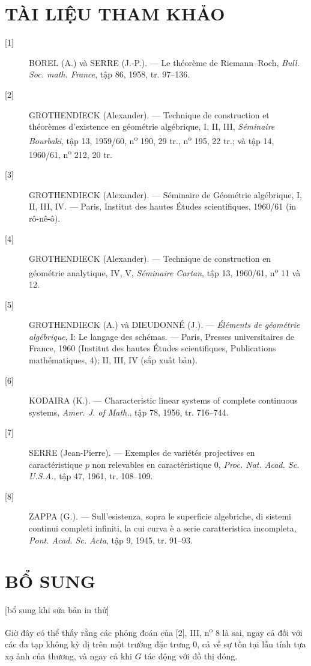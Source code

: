 \section*{TÀI LIỆU THAM KHẢO}

\begin{description}
\item[{[1]}] BOREL (A.) và SERRE (J.-P.). --- Le théorème de Riemann--Roch,
\emph{Bull. Soc. math. France}, tập 86, 1958, tr. 97--136.

\item[{[2]}] GROTHENDIECK (Alexander). --- Technique de construction et
théorèmes d'existence en géométrie algébrique, I, II, III, \emph{Séminaire
Bourbaki}, tập 13, 1959/60, n\textsuperscript{o} 190, 29 tr.,
n\textsuperscript{o} 195, 22 tr.; và tập 14, 1960/61,
n\textsuperscript{o} 212, 20 tr.

\item[{[3]}] GROTHENDIECK (Alexander). --- Séminaire de Géométrie algébrique,
I, II, III, IV. --- Paris, Institut des hautes Études scientifiques, 1960/61
(in rô-nê-ô).

\item[{[4]}] GROTHENDIECK (Alexander). --- Technique de construction en
géométrie analytique, IV, V, \emph{Séminaire Cartan}, tập 13, 1960/61,
n\textsuperscript{o} 11 và 12.

\item[{[5]}] GROTHENDIECK (A.) và DIEUDONNÉ (J.). --- \emph{Éléments de
géométrie algébrique}, I: Le langage des schémas. --- Paris, Presses
universitaires de France, 1960 (Institut des hautes Études scientifiques,
Publications mathématiques, 4); II, III, IV (sắp xuất bản).

\item[{[6]}] KODAIRA (K.). --- Characteristic linear systems of complete
continuous systems, \emph{Amer. J. of Math.}, tập 78, 1956, tr. 716--744.

\item[{[7]}] SERRE (Jean-Pierre). --- Exemples de variétés projectives en
caractéristique $p$ non relevables en caractéristique 0, \emph{Proc. Nat. Acad.
Sc. U.S.A.}, tập 47, 1961, tr. 108--109.

\item[{[8]}] ZAPPA (G.). --- Sull'esistenza, sopra le superficie algebriche, di
sistemi continui completi infiniti, la cui curva è a serie caratteristica
incompleta, \emph{Pont. Acad. Sc. Acta}, tập 9, 1945, tr. 91--93.
\end{description}

\section*{BỔ SUNG}
\begin{center}
{\small [bổ sung khi sửa bản in thử]}
\end{center}

Giờ đây có thể thấy rằng các phỏng đoán của [2], III,
n\textsuperscript{o} 8 là sai, ngay cả đối với các đa tạp không kỳ dị trên một
trường đặc trưng 0, cả về sự tồn tại lẫn tính tựa xạ ảnh của thương, và ngay cả
khi $G$ tác động với đồ thị đóng.

\par
